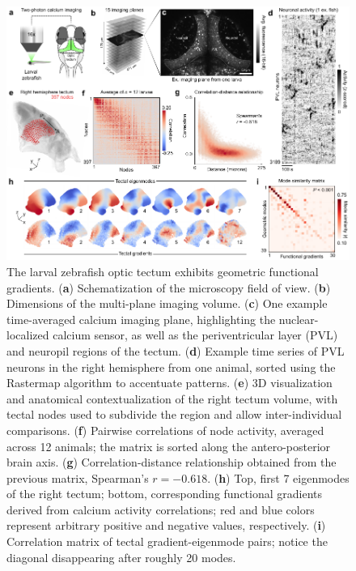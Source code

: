 \documentclass{article}
\begin{document}
\begin{figure}[t]
    \centering
    \includegraphics[width=0.95\linewidth]{figures/figure6.pdf}
    \caption{The larval zebrafish optic tectum exhibits geometric functional gradients. (\textbf{a}) Schematization of the microscopy field of view. (\textbf{b}) Dimensions of the multi-plane imaging volume. (\textbf{c}) One example time-averaged calcium imaging plane, highlighting the nuclear-localized calcium sensor, as well as the periventricular layer (PVL) and neuropil regions of the tectum. (\textbf{d}) Example time series of PVL neurons in the right hemisphere from one animal, sorted using the Rastermap\cite{stringer2025rastermap} algorithm to accentuate patterns. (\textbf{e}) 3D visualization and anatomical contextualization of the right tectum volume, with tectal nodes used to subdivide the region and allow inter-individual comparisons. (\textbf{f}) Pairwise correlations of node activity, averaged across 12 animals; the matrix is sorted along the antero-posterior brain axis. (\textbf{g}) Correlation-distance relationship obtained from the previous matrix, Spearman's $r=-0.618$. (\textbf{h}) Top, first 7 eigenmodes of the right tectum; bottom, corresponding functional gradients derived from calcium activity correlations; red and blue colors represent arbitrary positive and negative values, respectively. (\textbf{i}) Correlation matrix of tectal gradient-eigenmode pairs; notice the diagonal disappearing after roughly 20 modes.}
    \label{fig6}
    \hrulefill
\end{figure}
\end{document}
